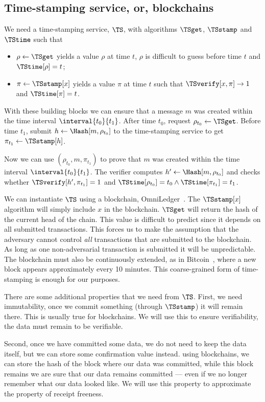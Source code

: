 \subsection{Time-stamping service, or, blockchains}%
\label{StorageProperties}


We need a time-stamping service, \(\TS\), with algorithms \(\TSget\), 
\(\TSstamp\) and \(\TStime\) such that
\begin{itemize}
  \item \(\rho \gets \TSget\) yields a value \(\rho\) at time \(t\), \(\rho\) is 
    difficult to guess before time \(t\) and \(\TStime[\rho] = t\);
  \item \(\pi\gets \TSstamp[x]\) yields a value \(\pi\) at time \(t\) such that 
    \(\TSverify[x, \pi]\to 1\) and \(\TStime[\pi] = t\).
\end{itemize}

With these building blocks we can ensure that a message \(m\) was created within 
the time interval \(\interval{t_0}{t_1}\).
After time \(t_0\), request \(\rho_{t_0}\gets \TSget\).
Before time \(t_1\), submit \(h\gets \Hash[m, \rho_{t_0}]\) to the time-stamping 
service to get \(\pi_{t_1}\gets \TSstamp[h]\).

Now we can use \((\rho_{t_0}, m, \pi_{t_1})\) to prove that \(m\) was created 
within the time interval \(\interval{t_0}{t_1}\).
The verifier computes \(h'\gets \Hash[m, \rho_{t_0}]\) and checks whether 
\(\TSverify[h', \pi_{t_1}] = 1\) and \(\TStime[\rho_{t_0}] = t_0\land 
  \TStime[\pi_{t_1}] = t_1\).

We can instantiate \(\TS\) using a blockchain, \eg OmniLedger~\cite{OmniLedger}.
The \(\TSstamp[x]\) algorithm will simply include \(x\) in the blockchain.
\(\TSget\) will return the hash of the current head of the chain.
This value is difficult to predict since it depends on all submitted 
transactions.
This forces us to make the assumption that the adversary cannot control 
\emph{all} transactions that are submitted to the blockchain.
As long as one non-adversarial transaction is submitted it will be 
unpredictable.
The blockchain must also be continuously extended, \eg as in
Bitcoin~\cite{Bitcoin}, where a new block appears approximately every 10 
minutes.
This coarse-grained form of time-stamping is enough for our purposes.

There are some additional properties that we need from \(\TS\).
First, we need immutability, \ie once we commit something (through \(\TSstamp\)) 
it will remain there.
This is usually true for blockchains.
We will use this to ensure verifiability, the data must remain to be verifiable.

Second, once we have committed some data, we do not need to keep the data 
itself, but we can store some confirmation value instead.
\Eg using blockchains, we can store the hash of the block where our data was 
committed, while this block remains we are sure that our data remains committed 
--- even if we no longer remember what our data looked like.
We will use this property to approximate the property of receipt freeness.
